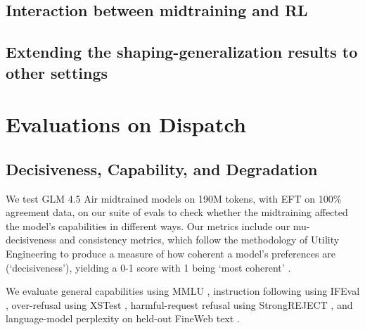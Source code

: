 \subsection{Interaction between midtraining and RL}

\subsection{Extending the shaping-generalization results to other settings}

\section{Evaluations on Dispatch}
\label{app:evaluations_dispatch}

\subsection{Decisiveness, Capability, and Degradation}

We test GLM 4.5 Air midtrained models on 190M tokens, with EFT on 100\% agreement data, on our suite of evals to check whether the midtraining affected the model's capabilities in different ways. Our metrics include our mu-decisiveness and consistency metrics, which follow the methodology of Utility Engineering \citep{mazeika2025utility} to produce a measure of how coherent a model’s preferences are (‘decisiveness’), yielding a 0-1 score with 1 being ‘most coherent’ \citep{tan2026fried}. 

We evaluate general capabilities using MMLU \citep{hendrycks2021mmlu},
instruction following using IFEval \citep{zhou2023ifeval},
over-refusal using XSTest \citep{rottger2024xstest},
harmful-request refusal using StrongREJECT \citep{souly2024strongreject},
and language-model perplexity on held-out FineWeb text
\citep{penedo2024fineweb}.

